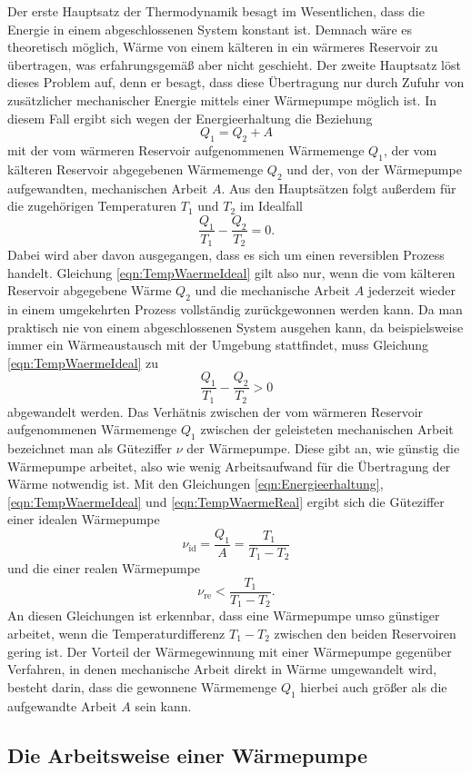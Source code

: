 Der erste Hauptsatz der Thermodynamik
besagt im Wesentlichen, dass die Energie in einem
abgeschlossenen System konstant ist. Demnach wäre es theoretisch möglich,
Wärme von einem kälteren in ein wärmeres Reservoir zu übertragen, was
erfahrungsgemäß aber nicht geschieht.
Der zweite Hauptsatz löst dieses Problem auf, denn er besagt, dass diese
Übertragung nur durch Zufuhr von zusätzlicher mechanischer Energie
mittels einer Wärmepumpe möglich ist. In diesem Fall ergibt sich wegen der
Energieerhaltung die Beziehung
\begin{equation}
  Q_1 = Q_2 + A
  \label{eqn:Energieerhaltung}
\end{equation}
mit der vom wärmeren Reservoir aufgenommenen Wärmemenge $Q_1$, der vom kälteren
Reservoir abgegebenen Wärmemenge $Q_2$ und der, von der Wärmepumpe aufgewandten,
mechanischen Arbeit $A$.
Aus den Hauptsätzen folgt außerdem für die zugehörigen Temperaturen $T_1$ und
$T_2$ im Idealfall
\begin{equation}
  \frac{Q_1}{T_1} - \frac{Q_2}{T_2} = 0.
  \label{eqn:TempWaermeIdeal}
\end{equation}
Dabei wird aber davon ausgegangen, dass es sich um einen reversiblen Prozess
handelt. Gleichung \eqref{eqn:TempWaermeIdeal} gilt also nur, wenn die vom
kälteren Reservoir abgegebene Wärme $Q_2$ und die mechanische Arbeit $A$
jederzeit wieder in einem umgekehrten Prozess vollständig zurückgewonnen werden
kann. Da man praktisch nie von einem abgeschlossenen System ausgehen kann, da
beispielsweise immer ein Wärmeaustausch mit der Umgebung stattfindet, muss
Gleichung \eqref{eqn:TempWaermeIdeal} zu
\begin{equation}
  \frac{Q_1}{T_1} - \frac{Q_2}{T_2} > 0
  \label{eqn:TempWaermeReal}
\end{equation}
abgewandelt werden.
Das Verhätnis zwischen der vom wärmeren Reservoir aufgenommenen Wärmemenge $Q_1$
zwischen der geleisteten mechanischen Arbeit bezeichnet man als Güteziffer $\nu$
der Wärmepumpe. Diese gibt an, wie günstig die Wärmepumpe arbeitet, also wie
wenig Arbeitsaufwand für die Übertragung der Wärme notwendig ist.
Mit den Gleichungen \eqref{eqn:Energieerhaltung}, \eqref{eqn:TempWaermeIdeal}
und \eqref{eqn:TempWaermeReal} ergibt sich die Güteziffer einer idealen
Wärmepumpe
\begin{equation}
  \nu_\text{id} = \frac{Q_1}{A} = \frac{T_1}{T_1-T_2}
\end{equation}
und die einer realen Wärmepumpe
\begin{equation}
  \nu_\text{re} < \frac{T_1}{T_1-T_2}.
\end{equation}
An diesen Gleichungen ist erkennbar, dass eine Wärmepumpe umso günstiger
arbeitet, wenn die Temperaturdifferenz $T_1-T_2$ zwischen den beiden Reservoiren
gering ist.
Der Vorteil der Wärmegewinnung mit einer Wärmepumpe gegenüber Verfahren, in
denen mechanische Arbeit direkt in Wärme umgewandelt wird, besteht darin, dass
die gewonnene Wärmemenge $Q_1$ hierbei auch größer als die aufgewandte Arbeit
$A$ sein kann.

\subsection{Die Arbeitsweise einer Wärmepumpe}




\cite{anleitung}
